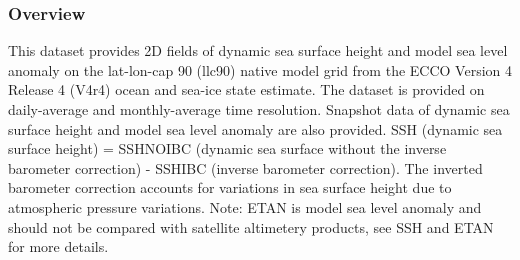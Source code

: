 \subsubsection{Overview}
This dataset provides 2D fields of dynamic sea surface height and model sea level anomaly on the lat-lon-cap 90 (llc90) native model grid from the ECCO Version 4 Release 4 (V4r4) ocean and sea-ice state estimate. The dataset is provided on daily-average and monthly-average time resolution. Snapshot data of dynamic sea surface height and model sea level anomaly are also provided. SSH (dynamic sea surface height) = SSHNOIBC (dynamic sea surface without the inverse barometer correction) - SSHIBC (inverse barometer correction). The inverted barometer correction accounts for variations in sea surface height due to atmospheric pressure variations. Note: ETAN is model sea level anomaly and should not be compared with satellite altimetery products, see SSH and ETAN for more details. 
